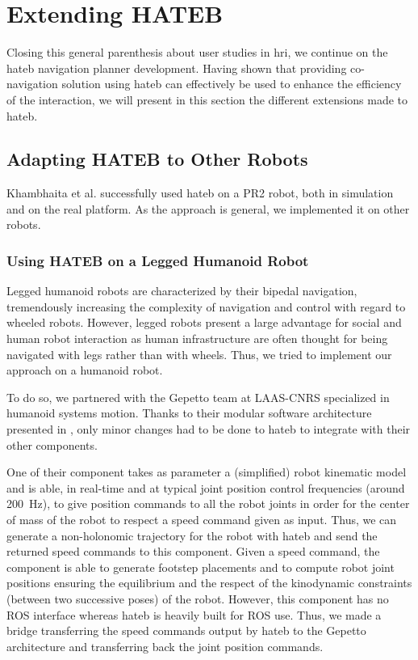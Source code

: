\documentclass[a4paper,11pt,twoside]{StyleThese}
\begin{document}
\section{Extending HATEB}
Closing this general parenthesis about user studies in \acrshort{hri}, we continue on the \acrshort{hateb} navigation planner development. Having shown that providing co-navigation solution using \acrshort{hateb} can effectively be used to enhance the efficiency of the interaction, we will present in this section the different extensions made to \acrshort{hateb}.

\subsection{Adapting HATEB to Other Robots}
Khambhaita et al. \cite{khambhaita_head-body_2016} successfully used \acrshort{hateb} on a PR2 robot, both in simulation and on the real platform. As the approach is general, we implemented it on other robots.

\subsubsection{Using HATEB on a Legged Humanoid Robot}
Legged humanoid robots are characterized by their bipedal navigation, tremendously increasing the complexity of navigation and control with regard to wheeled robots. However, legged robots present a large advantage for social and human robot interaction as human infrastructure are often thought for being navigated with legs rather than with wheels. Thus, we tried to implement our approach on a humanoid robot.

To do so, we partnered with the Gepetto team at LAAS-CNRS specialized in humanoid systems motion. Thanks to their modular software architecture presented in \cite{stasse_modular_architecture_2008}, only minor changes had to be done to \acrshort{hateb} to integrate with their other components.

One of their component \cite{naveau_reactive_walking_2017} takes as parameter a (simplified) robot kinematic model and is able, in real-time and at typical joint position control frequencies (around 200~Hz), to give position commands to all the robot joints in order for the center of mass of the robot to respect a speed command given as input. Thus, we can generate a non-holonomic trajectory for the robot with \acrshort{hateb} and send the returned speed commands to this component. Given a speed command, the component is able to generate footstep placements and to compute robot joint positions ensuring the equilibrium and the respect of the kinodynamic constraints (between two successive poses) of the robot. However, this component has no ROS interface whereas \acrshort{hateb} is heavily built for ROS use. Thus, we made a bridge transferring the speed commands output by \acrshort{hateb} to the Gepetto architecture and transferring back the joint position commands.
\end{document}
